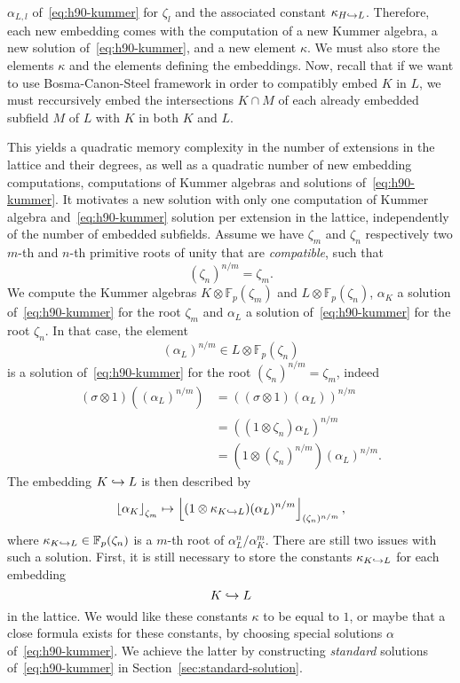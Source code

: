 $\alpha_{L, l}$ of~\eqref{eq:h90-kummer} for $\zeta_l$ and the associated
constant $\kappa_{H\hookrightarrow L}$. Therefore, each new embedding comes with the
computation of a new Kummer algebra, a new solution of~\eqref{eq:h90-kummer}, and a
new element $\kappa$. We must also store the elements $\kappa$ and the elements
defining the embeddings. Now, recall that if we want to use Bosma-Canon-Steel
framework in order to compatibly embed $K$ in $L$, we must reccursively embed
the intersections $K\cap M$ of each already embedded subfield $M$ of $L$ with $K$ in both $K$
and $L$.
\begin{center}
\end{center}
This yields a quadratic memory complexity in the number of extensions in the
lattice and their degrees, as well as a quadratic number of new embedding
computations, \ie computations of Kummer algebras and solutions
of~\eqref{eq:h90-kummer}. It motivates a new solution with only one computation
of Kummer algebra and~\eqref{eq:h90-kummer} solution per extension in the lattice,
independently of the number of embedded subfields. Assume we have $\zeta_m$ and
$\zeta_n$ respectively two $m$-th and $n$-th primitive roots
of unity that are \emph{compatible}, \ie such that
\[
  (\zeta_n)^{n/m} = \zeta_m.
\]
We compute the Kummer algebras $K\otimes\mathbb{F}_{p}(\zeta_m)$ and
$L\otimes\mathbb{F}_p(\zeta_n)$, $\alpha_K$ a solution of~\eqref{eq:h90-kummer}
for the root $\zeta_m$ and $\alpha_L$ a solution of~\eqref{eq:h90-kummer} for
the root $\zeta_n$. In that case, the element
\[
  (\alpha_L)^{n/m}\in L\otimes\mathbb{F}_p(\zeta_n)
\]
is a solution of~\eqref{eq:h90-kummer} for the root $(\zeta_n)^{n/m}=\zeta_m$,
indeed
\begin{align*}
  (\sigma\otimes1)((\alpha_L)^{n/m}) &=
  ( (\sigma\otimes1)(\alpha_{L}))^{n/m} \\
  &= ( (1\otimes\zeta_n)\alpha_L)^{n/m}\\
  &= (1\otimes (\zeta_n)^{n/m})(\alpha_L)^{n/m}.
\end{align*}
The embedding $K\hookrightarrow L$ is then described by
\[
  \left\lfloor \alpha_K \right\rfloor_{\zeta_m}\mapsto\left\lfloor (1\otimes\kappa_{K\hookrightarrow
  L})(\alpha_L)^{n/m} \right\rfloor_{(\zeta_n)^{n/m}},
\]
where $\kappa_{K\hookrightarrow L}\in\mathbb{F}_p(\zeta_n)$ is a $m$-th root of
$\alpha_L^n/\alpha_K^m$. There are still two issues with such a solution. First,
it is still necessary to store the constants $\kappa_{K\hookrightarrow L}$ for each
embedding
\[
  K\hookrightarrow L
\]
in the lattice. We would like these constants $\kappa$ to be equal to $1$, or
maybe that a close formula exists for these constants, by choosing special
solutions $\alpha$ of~\eqref{eq:h90-kummer}. We achieve the latter
by constructing \emph{standard} solutions of~\eqref{eq:h90-kummer} in
Section~\ref{sec:standard-solution}.


